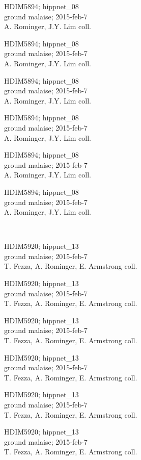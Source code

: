 \documentclass[2pt]{extarticle}
\begin{document}
\noindent
\parbox{0.16\textwidth}{\tiny \raggedright \rule[-0.3\baselineskip]{0pt}{10pt}HDIM5894; hippnet\_08\\ ground malaise; 2015-feb-7\\ A. Rominger, J.Y. Lim coll.}
\parbox{0.16\textwidth}{\tiny \raggedright \rule[-0.3\baselineskip]{0pt}{10pt}HDIM5894; hippnet\_08\\ ground malaise; 2015-feb-7\\ A. Rominger, J.Y. Lim coll.}
\parbox{0.16\textwidth}{\tiny \raggedright \rule[-0.3\baselineskip]{0pt}{10pt}HDIM5894; hippnet\_08\\ ground malaise; 2015-feb-7\\ A. Rominger, J.Y. Lim coll.}
\parbox{0.16\textwidth}{\tiny \raggedright \rule[-0.3\baselineskip]{0pt}{10pt}HDIM5894; hippnet\_08\\ ground malaise; 2015-feb-7\\ A. Rominger, J.Y. Lim coll.}
\parbox{0.16\textwidth}{\tiny \raggedright \rule[-0.3\baselineskip]{0pt}{10pt}HDIM5894; hippnet\_08\\ ground malaise; 2015-feb-7\\ A. Rominger, J.Y. Lim coll.}
\parbox{0.16\textwidth}{\tiny \raggedright \rule[-0.3\baselineskip]{0pt}{10pt}HDIM5894; hippnet\_08\\ ground malaise; 2015-feb-7\\ A. Rominger, J.Y. Lim coll.} \\ 
\vspace{0.001in} 

\noindent
\parbox{0.16\textwidth}{\tiny \raggedright \rule[-0.3\baselineskip]{0pt}{10pt}HDIM5920; hippnet\_13\\ ground malaise; 2015-feb-7\\ T. Fezza, A. Rominger, E. Armstrong coll.}
\parbox{0.16\textwidth}{\tiny \raggedright \rule[-0.3\baselineskip]{0pt}{10pt}HDIM5920; hippnet\_13\\ ground malaise; 2015-feb-7\\ T. Fezza, A. Rominger, E. Armstrong coll.}
\parbox{0.16\textwidth}{\tiny \raggedright \rule[-0.3\baselineskip]{0pt}{10pt}HDIM5920; hippnet\_13\\ ground malaise; 2015-feb-7\\ T. Fezza, A. Rominger, E. Armstrong coll.}
\parbox{0.16\textwidth}{\tiny \raggedright \rule[-0.3\baselineskip]{0pt}{10pt}HDIM5920; hippnet\_13\\ ground malaise; 2015-feb-7\\ T. Fezza, A. Rominger, E. Armstrong coll.}
\parbox{0.16\textwidth}{\tiny \raggedright \rule[-0.3\baselineskip]{0pt}{10pt}HDIM5920; hippnet\_13\\ ground malaise; 2015-feb-7\\ T. Fezza, A. Rominger, E. Armstrong coll.}
\parbox{0.16\textwidth}{\tiny \raggedright \rule[-0.3\baselineskip]{0pt}{10pt}HDIM5920; hippnet\_13\\ ground malaise; 2015-feb-7\\ T. Fezza, A. Rominger, E. Armstrong coll.} \\ 
\vspace{0.001in} 
\end{document}
